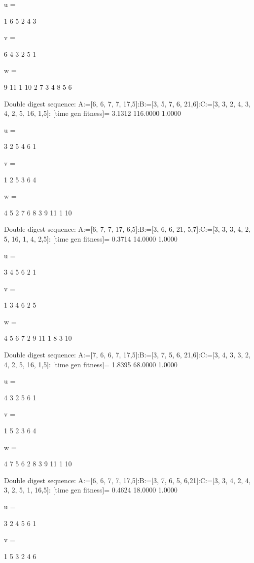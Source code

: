 u =

     1     6     5     2     4     3


v =

     6     4     3     2     5     1


w =

     9    11     1    10     2     7     3     4     8     5     6

Double digest sequence:
A:=[6, 6, 7, 7, 17,5]:B:=[3, 5, 7, 6, 21,6]:C:=[3, 3, 2, 4, 3, 4, 2, 5, 16, 1,5]:
[time gen fitness]=
    3.1312  116.0000    1.0000


u =

     3     2     5     4     6     1


v =

     1     2     5     3     6     4


w =

     4     5     2     7     6     8     3     9    11     1    10

Double digest sequence:
A:=[6, 7, 7, 17, 6,5]:B:=[3, 6, 6, 21, 5,7]:C:=[3, 3, 3, 4, 2, 5, 16, 1, 4, 2,5]:
[time gen fitness]=
    0.3714   14.0000    1.0000


u =

     3     4     5     6     2     1


v =

     1     3     4     6     2     5


w =

     4     5     6     7     2     9    11     1     8     3    10

Double digest sequence:
A:=[7, 6, 6, 7, 17,5]:B:=[3, 7, 5, 6, 21,6]:C:=[3, 4, 3, 3, 2, 4, 2, 5, 16, 1,5]:
[time gen fitness]=
    1.8395   68.0000    1.0000


u =

     4     3     2     5     6     1


v =

     1     5     2     3     6     4


w =

     4     7     5     6     2     8     3     9    11     1    10

Double digest sequence:
A:=[6, 6, 7, 7, 17,5]:B:=[3, 7, 6, 5, 6,21]:C:=[3, 3, 4, 2, 4, 3, 2, 5, 1, 16,5]:
[time gen fitness]=
    0.4624   18.0000    1.0000


u =

     3     2     4     5     6     1


v =

     1     5     3     2     4     6


